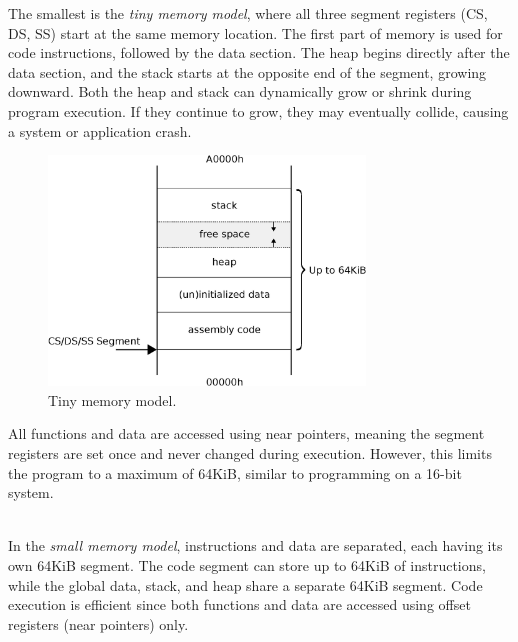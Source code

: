 \documentclass[book.tex]{subfiles}
\begin{document}
The smallest is the \textit{tiny memory model}, where all three segment registers (CS, DS, SS) start at the same memory location. The first part of memory is used for code instructions, followed by the data section. The heap begins directly after the data section, and the stack starts at the opposite end of the segment, growing downward. Both the heap and stack can dynamically grow or shrink during program execution. If they continue to grow, they may eventually collide, causing a system or application crash. \\

\begin{figure}[H]
\centering
\includegraphics[width=0.75\textwidth]{imgs/drawings/memory/tiny_mm.eps}
\caption{Tiny memory model.}
\label{fig:mm_tiny}
\end{figure}

\par
All functions and data are accessed using near pointers, meaning the segment registers are set once and never changed during execution. However, this limits the program to a maximum of 64KiB, similar to programming on a 16-bit system.\\

\\

\par
In the \textit{small memory model}, instructions and data are separated, each having its own 64KiB segment. The code segment can store up to 64KiB of instructions, while the global data, stack, and heap share a separate 64KiB segment. Code execution is efficient since both functions and data are accessed using offset registers (near pointers) only.\\
\end{document}

